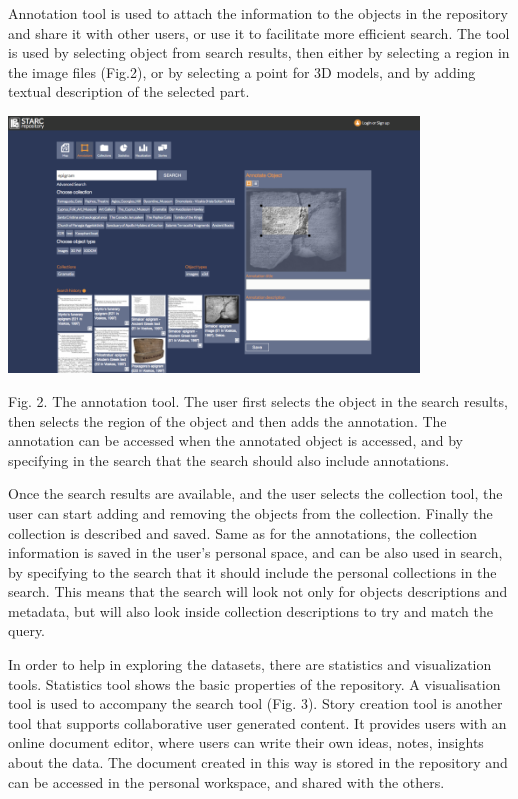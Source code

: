 \documentclass[amsthm,ebook]{saparticle}
\begin{document}
Annotation tool is used to attach the information to the objects in the repository and share it with other users, or use
it to facilitate more efficient search. The tool is used by selecting object from search results, then either by
selecting a region in the image files (Fig.2), or by selecting a point for 3D models, and by adding textual description
of the selected part. 

 \includegraphics[width=10.896cm,height=6.81cm]{DamnjanovicetalEAGLE2016-img002.png} 

Fig. 2. The annotation tool. The user first selects the object in the search results, then selects the region of the
object and then adds the annotation. The annotation can be accessed when the annotated object is accessed, and by
specifying in the search that the search should also include annotations. \ 

Once the search results are available, and the user selects the collection tool, the user can start adding and removing
the objects from the collection. Finally the collection is described and saved. Same as for the annotations, the
collection information is saved in the user’s personal space, and can be also used in search, by specifying to the
search that it should include the personal collections in the search. This means that the search will look not only for
objects descriptions and metadata, but will also look inside collection descriptions to try and match the query. 

In order to help in exploring the datasets, there are statistics and visualization tools. Statistics tool shows the
basic properties of the repository. A visualisation tool is used to accompany the search tool (Fig. 3). Story creation
tool is another tool that supports collaborative user generated content. It provides users with an online document
editor, where users can write their own ideas, notes, insights about the data. The document created in this way is
stored in the repository and can be accessed in the personal workspace, and shared with the others. 
\end{document}
